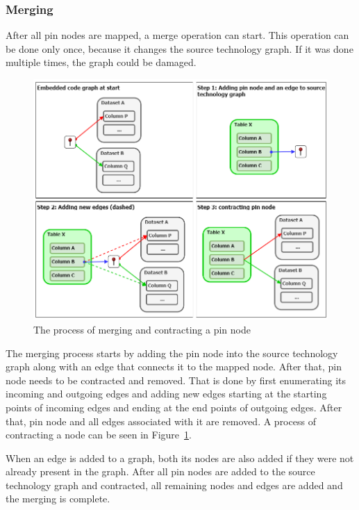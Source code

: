 \subsubsection{Merging}
After all pin nodes are mapped, a merge operation can start. This operation can be done only once, because it changes the source technology graph. If it was done multiple times, the graph could be damaged.
\begin{figure}[ht]\centering
\includegraphics[width=1.0\textwidth]{img/contraction.png}
\caption{The process of merging and contracting a pin node}
\label{fig:contraction}
\end{figure}   
\par
The merging process starts by adding the pin node into the source technology graph along with an edge that connects it to the mapped node. After that, pin node needs to be contracted and removed. That is done by first enumerating its incoming and outgoing edges and adding new edges starting at the starting points of incoming edges and ending at the end points of outgoing edges. After that, pin node and all edges associated with it are removed. A process of contracting a node can be seen in Figure~\ref{fig:contraction}.
\par
When an edge is added to a graph, both its nodes are also added if they were not already present in the graph. After all pin nodes are added to the source technology graph and contracted, all remaining nodes and edges are added and the merging is complete. 

